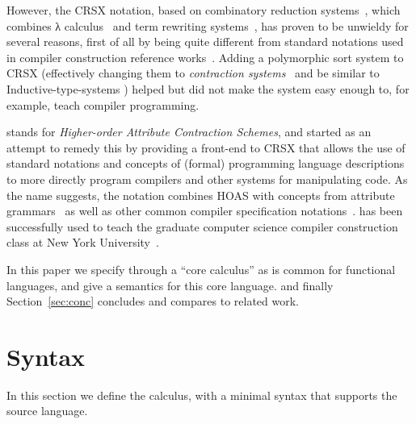 \documentclass[letterpaper,11pt]{article}
\begin{document}
However, the CRSX notation, based on combinatory reduction systems~\cite{Klop:1980,Klop+:tcs1993},
which combines λ calculus~\cite{Church:1941,Barendregt:1984} and term rewriting
systems~\cite{Klop:1992:Handbook}, has proven to be unwieldy for several reasons, first of all by
being quite different from standard notations used in compiler construction reference
works~\cite{Aho+:2006}. Adding a polymorphic sort system to CRSX (effectively changing them to
\emph{contraction systems}~\cite{Aczel:1978} and be similar to Inductive-type-systems
\cite{BlanquiJouannaudOkada:tcs2002}) helped but did not make the system easy enough to, for
example, teach compiler programming.

\HAX stands for \emph{Higher-order Attribute Contraction Schemes}, and started as an attempt to
remedy this by providing a front-end to CRSX that allows the use of standard notations and concepts
of (formal) programming language descriptions to more directly program compilers and other systems
for manipulating code. As the name suggests, the notation combines HOAS with concepts from attribute
grammars~\cite{Knuth:mst1968} as well as other common compiler specification
notations~\cite{Aho+:2006}. \HAX has been successfully used to teach the graduate computer science
compiler construction class at New York University~\cite{RoseRose:cims2015}.

In this paper we specify \HAX through a ``core calculus'' as is common for functional languages, and
give a semantics for this core language.
%
and finally Section~\ref{sec:conc} concludes and compares to related work.



\section{\hax Syntax}
\label{sec:hacs}

In this section we define the \hax calculus, with a minimal syntax that supports the \HAX source
language.
\end{document}
